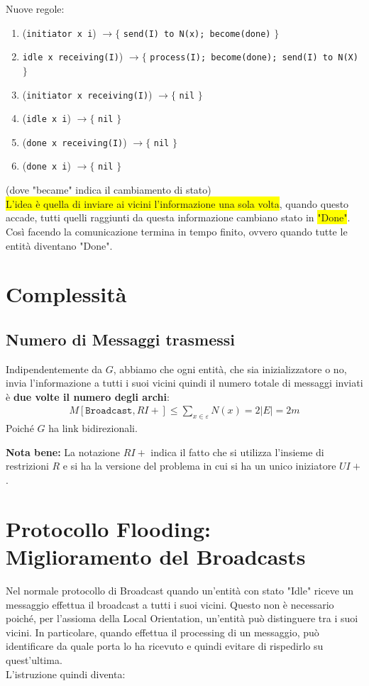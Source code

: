 Nuove regole:
\begin{enumerate}
    \item (\texttt{initiator x i}) $\rightarrow \lbrace$ \texttt{send(I) to N(x);
              become(done)} $\rbrace$
    \item \texttt{idle x receiving(I)}) $\rightarrow \lbrace$ \texttt{process(I);
              become(done); send(I) to N(X)} $\rbrace$
    \item (\texttt{initiator x receiving(I)}) $\rightarrow \lbrace$ \texttt{nil}
          $\rbrace$
    \item (\texttt{idle x i}) $\rightarrow \lbrace$ \texttt{nil} $\rbrace$
    \item (\texttt{done x receiving(I)}) $\rightarrow \lbrace$ \texttt{nil}
          $\rbrace$
    \item (\texttt{done x i}) $\rightarrow \lbrace$ \texttt{nil} $\rbrace$
\end{enumerate}

(dove "became" indica il cambiamento di stato)\\

\colorbox{yellow}{L'idea è quella di inviare ai vicini l'informazione una sola
    volta}, quando questo accade, tutti quelli raggiunti da questa informazione
cambiano stato in \colorbox{yellow}{"Done"}. Così facendo la comunicazione
termina in tempo finito, ovvero quando tutte le entità diventano "Done".

\section{Complessità}
\subsection{Numero di Messaggi trasmessi}
Indipendentemente da $G$, abbiamo che ogni entità, che sia inizializzatore o no,
invia l'informazione a tutti i suoi vicini quindi il numero totale di messaggi
inviati è \textbf{due volte il numero degli archi}:
\begin{eqnarray}
    M[\texttt{Broadcast}, RI+]  \leq \sum_{x \in \varepsilon} N(x) = 2|E| = 2m
    \nonumber
\end{eqnarray}
Poiché $G$ ha link bidirezionali.

\textbf{Nota bene:} La notazione $RI+$ indica il fatto che si utilizza l'insieme
di restrizioni $R$ e si ha la versione del problema in cui si ha un unico
iniziatore $UI+$.

\section{Protocollo Flooding: Miglioramento del Broadcasts}
Nel normale protocollo di Broadcast quando un'entità con stato "Idle" riceve un
messaggio effettua il broadcast a tutti i suoi vicini. Questo non è necessario
poiché, per l'assioma della Local Orientation, un'entità può distinguere tra i
suoi vicini. In particolare, quando effettua il processing di un messaggio, può
identificare da quale porta lo ha ricevuto e quindi evitare di rispedirlo su
quest'ultima.\\
L'istruzione quindi diventa:

